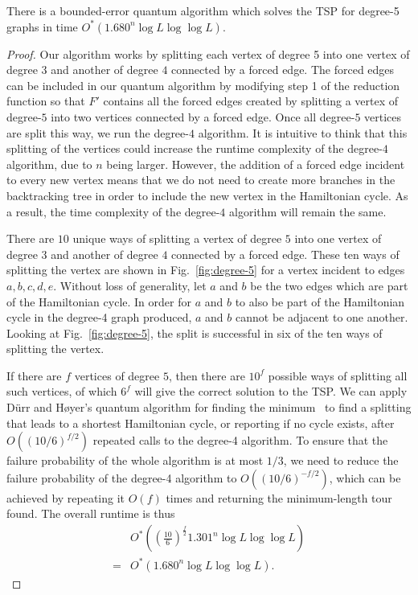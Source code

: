 \begin{theorem}
\label{thm:deg5}
There is a bounded-error quantum algorithm which solves the TSP for degree-5 graphs in time $O^*(1.680^n\log L\log \log L)$.
\end{theorem}

\begin{proof}
Our algorithm works by splitting each vertex of degree 5 into one vertex of degree $3$ and another of degree $4$ connected by a forced edge. The forced edges can be included in our quantum algorithm by modifying step 1 of the reduction function so that $F'$ contains all the forced edges created by splitting a vertex of degree-$5$ into two vertices connected by a forced edge. Once all degree-$5$ vertices are split this way, we run the degree-$4$ algorithm. It is intuitive to think that this splitting of the vertices could increase the runtime complexity of the degree-$4$ algorithm, due to $n$ being larger. However, the addition of a forced edge incident to every new vertex means that we do not need to create more branches in the backtracking tree in order to include the new vertex in the Hamiltonian cycle. As a result, the time complexity of the degree-$4$ algorithm will remain the same.

There are $10$ unique ways of splitting a vertex of degree $5$ into one vertex of degree $3$ and another of degree $4$ connected by a forced edge. These ten ways of splitting the vertex are shown in Fig.\ \ref{fig:degree-5} for a vertex incident to edges $a,b,c,d,e$. Without loss of generality, let $a$ and $b$ be the two edges which are part of the Hamiltonian cycle. In order for $a$ and $b$ to also be part of the Hamiltonian cycle in the degree-4 graph produced, $a$ and $b$ cannot be adjacent to one another. Looking at Fig.\ \ref{fig:degree-5}, the split is successful in six of the ten ways of splitting the vertex.

If there are $f$ vertices of degree $5$, then there are $10^f$ possible ways of splitting all such vertices, of which $6^f$ will give the correct solution to the TSP. We can apply D\"urr and H\o yer's quantum algorithm for finding the minimum~\cite{durr1996} to find a splitting that leads to a shortest Hamiltonian cycle, or reporting if no cycle exists, after $O((10/6)^{f/2})$ repeated calls to the degree-4 algorithm. To ensure that the failure probability of the whole algorithm is at most $1/3$, we need to reduce the failure probability of the degree-4 algorithm to $O((10/6)^{-f/2})$, which can be achieved by repeating it $O(f)$ times and returning the minimum-length tour found. The overall runtime is thus
%
\begin{align}
&O^*\left(\left(\frac{10}{6}\right)^{\frac{f}{2}}1.301^n\log L \log \log L\right)\\
 = &O^*(1.680^n\log L \log \log L).
\end{align}
\end{proof}
